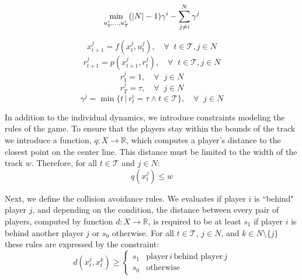 \begin{equation} \label{eq:gen_obj}
    \min_{u^i_0, ..., u^i_T} (|N|-1)\gamma^i - \sum^N_{j \neq i}\gamma^j \\
\end{equation}

\begin{equation} \label{eq:gen_dyn}
    x^j_{t+1} = f(x^j_t, u^j_t), \quad \forall \;\; t \in \mathcal{T}, j \in N
\end{equation}
\begin{equation} \label{eq:gen_idx_map}
    r^j_{t+1} = p(x^j_{t+1}, r^j_t), \quad \forall \;\; t \in \mathcal{T}, j \in N
\end{equation}
\begin{equation} \label{eq:gen_init_idx}
    r^j_{1} = 1, \quad \forall \;\; j \in N
\end{equation}
\begin{equation} \label{eq:gen_reach_goal}
    r^j_{T} = \tau, \quad \forall \;\; j \in N
\end{equation}
\begin{equation} \label{eq:gen_goal_time}
    \gamma^j = \min \{t \, | \, r^i_t = \tau \wedge t \in \mathcal{T} \}, \quad \forall \;\; j \in N
\end{equation}
    
In addition to the individual dynamics, we introduce constraints modeling the rules of the game.  To ensure that the players stay within the bounds of the track we introduce a function, $q: X \rightarrow \mathbb{R}$, which computes a player's distance to the closest point on the center line. This distance must be limited to the width of the track $w$. Therefore, for all $t \in \mathcal{T}$ and $j \in N$:
\begin{equation} \label{eq:gen_idx_dist}
    q(x^j_{t}) \leq w
\end{equation}

Next, we define the collision avoidance rules. We evaluates if player $i$ is ``behind" player $j$, and depending on the condition, the distance between every pair of players, computed by function $d: X \rightarrow \mathbb{R}$, is required to be at least $s_1$ if player $i$ is behind another player $j$ or $s_0$ otherwise. For all $t \in \mathcal{T}$, $j \in N$, and $k \in N \setminus \{j\}$ these rules are expressed by the constraint:
\begin{equation} \label{eq:gen_coll_avoid}
    d(x^j_{t}, x^k_t) \geq  \begin{cases} s_1 & \text{player} \, i \, \text{behind player}\,j\\
    s_0 & \text{otherwise}  \end{cases}
\end{equation}

